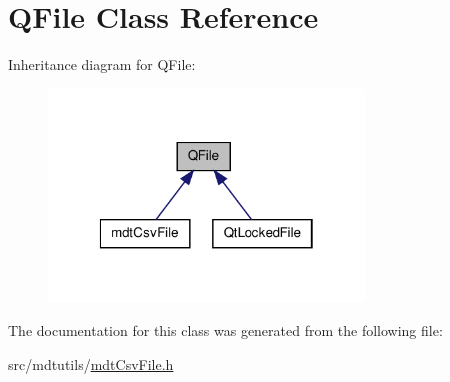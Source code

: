 \hypertarget{class_q_file}{\section{Q\-File Class Reference}
\label{class_q_file}
}


Inheritance diagram for Q\-File\-:\nopagebreak
\begin{figure}[H]
\begin{center}
\leavevmode
\includegraphics[width=238pt]{class_q_file__inherit__graph}
\end{center}
\end{figure}


The documentation for this class was generated from the following file\-:\begin{DoxyCompactItemize}
\item 
src/mdtutils/\hyperlink{mdt_csv_file_8h}{mdt\-Csv\-File.\-h}\end{DoxyCompactItemize}
